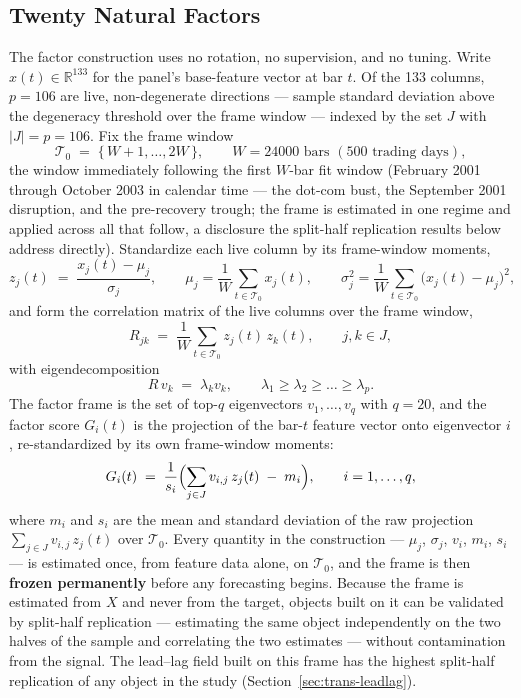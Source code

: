 \subsection{Twenty Natural Factors}

The factor construction uses no rotation, no supervision, and no tuning.
Write $x(t) \in \mathbb{R}^{133}$ for the panel's base-feature vector at bar
$t$. Of the 133 columns, $p = 106$ are live, non-degenerate directions ---
sample standard deviation above the degeneracy threshold over the frame
window --- indexed by the set $J$ with $|J| = p = 106$. Fix the frame window
\[
\mathcal{T}_0 \;=\; \{\, W+1, \dots, 2W \,\},
\qquad W = 24000 \text{ bars } (500 \text{ trading days}),
\]
the window immediately following the first $W$-bar fit window (February
2001 through October 2003 in calendar time --- the dot-com bust, the
September 2001 disruption, and the pre-recovery trough; the frame is
estimated in one regime and applied across all that follow, a disclosure
the split-half replication results below address directly). Standardize each live column by its frame-window moments,
\[
z_j(t) \;=\; \frac{x_j(t) - \mu_j}{\sigma_j},
\qquad
\mu_j = \frac{1}{W} \sum_{t \in \mathcal{T}_0} x_j(t),
\qquad
\sigma_j^2 = \frac{1}{W} \sum_{t \in \mathcal{T}_0} \bigl(x_j(t) - \mu_j\bigr)^2,
\]
and form the correlation matrix of the live columns over the frame window,
\[
R_{jk} \;=\; \frac{1}{W} \sum_{t \in \mathcal{T}_0} z_j(t)\, z_k(t),
\qquad j, k \in J,
\]
with eigendecomposition
\[
R\, v_k \;=\; \lambda_k v_k,
\qquad \lambda_1 \ge \lambda_2 \ge \dots \ge \lambda_p .
\]
The factor frame is the set of top-$q$ eigenvectors $v_1, \dots, v_q$ with
$q = 20$, and the factor score $G_i(t)$ is the projection of the bar-$t$
feature vector onto eigenvector $i$, re-standardized by its own frame-window
moments:
\[
G_i(t) \;=\; \frac{1}{s_i} \Bigl( \sum_{j \in J} v_{i,j}\, z_j(t) \;-\; m_i \Bigr),
\qquad i = 1, \dots, q,
\]
where $m_i$ and $s_i$ are the mean and standard deviation of the raw
projection $\sum_{j \in J} v_{i,j}\, z_j(t)$ over $\mathcal{T}_0$. Every
quantity in the construction --- $\mu_j$, $\sigma_j$, $v_i$, $m_i$, $s_i$ ---
is estimated once, from feature data alone, on $\mathcal{T}_0$, and the frame
is then \textbf{frozen permanently} before any forecasting begins. Because
the frame is estimated from $X$ and never from the target, objects built on
it can be validated by split-half replication --- estimating the same object
independently on the two halves of the sample and correlating the two
estimates --- without contamination from the signal. The lead--lag field
built on this frame has the highest split-half replication of any object in
the study (Section~\ref{sec:trans-leadlag}).

